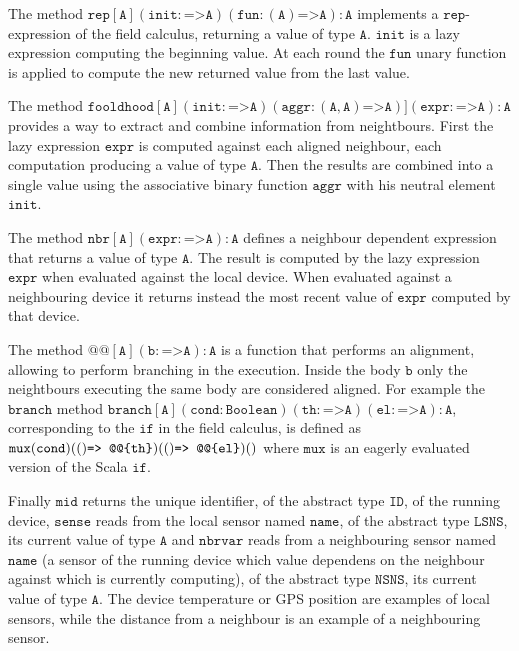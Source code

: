 The method $\mathtt{rep}[\mathtt{A}](\mathtt{init}: \texttt{=>} \mathtt{A})(\mathtt{fun}: (\mathtt{A}) \texttt{=>} \mathtt{A}): \mathtt{A}$ implements a $\mathtt{rep}$-expression of the field calculus, returning a value of type $\mathtt{A}$. $\mathtt{init}$ is a lazy expression computing the beginning value. At each round the $\mathtt{fun}$ unary function is applied to compute the new returned value from the last value.

The method $\mathtt{fooldhood}[\mathtt{A}](\mathtt{init}: \texttt{=>} \mathtt{A})(\mathtt{aggr}: (\mathtt{A},\mathtt{A}) \texttt{=>} \mathtt{A})](\mathtt{expr}: \texttt{=>} \mathtt{A}): \mathtt{A}$ provides a way to extract and combine information from neightbours. First the lazy expression $\mathtt{expr}$ is computed against each aligned neighbour, each computation producing a value of type $\mathtt{A}$. Then the results are combined into a single value using the associative binary function $\mathtt{aggr}$ with his neutral element $\mathtt{init}$.

The method $\mathtt{nbr}[\mathtt{A}](\mathtt{expr}: \texttt{=>} \mathtt{A}): \mathtt{A}$ defines a neighbour dependent expression that returns a value of type $\mathtt{A}$. The result is computed by the lazy expression $\mathtt{expr}$ when evaluated against the local device. When evaluated against a neighbouring device it returns instead the most recent value of $\mathtt{expr}$ computed by that device.

The method $@@[\mathtt{A}](\mathtt{b}: \texttt{=>} \mathtt{A}): \mathtt{A}$ is a function that performs an alignment, allowing to perform branching in the execution. Inside the body $\mathtt{b}$ only the neightbours executing the same body are considered aligned. For example the $\mathtt{branch}$ method $\mathtt{branch}[\mathtt{A}](\mathtt{cond}: \mathtt{Boolean})(\mathtt{th}: \texttt{=>} \mathtt{A})(\mathtt{el}: \texttt{=>} \mathtt{A}): \mathtt{A}$, corresponding to the $\mathtt{if}$ in the field calculus, is defined as $\mathtt{mux}(\mathtt{cond})(()\mathrm{ \texttt{=> @@\{} \mathtt{th} \texttt{\}} })(()\mathrm{ \texttt{=> @@\{} \mathtt{el} \texttt{\}} })()$ where $\mathtt{mux}$ is an eagerly evaluated version of the Scala $\mathtt{if}$.

Finally $\mathtt{mid}$ returns the unique identifier, of the abstract type $\mathtt{ID}$, of the running device, $\mathtt{sense}$ reads from the local sensor named $\mathtt{name}$, of the abstract type $\mathtt{LSNS}$, its current value of type $\mathtt{A}$ and $\mathtt{nbrvar}$ reads from a neighbouring sensor named $\mathtt{name}$ (a sensor of the running device which value dependens on the neighbour against which is currently computing), of the abstract type $\mathtt{NSNS}$, its current value of type $\mathtt{A}$. The device temperature or GPS position are examples of local sensors, while the distance from a neighbour is an example of a neighbouring sensor.


